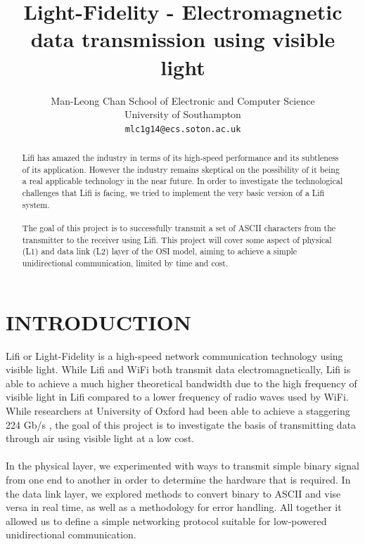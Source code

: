 \documentclass[letterpaper, 10 pt, conference]{ieeeconf}  %
\title{\LARGE \bf
Light-Fidelity - Electromagnetic data transmission using visible light
}
\author{ \parbox{3 in}{\centering Man-Leong Chan
        School of Electronic and Computer Science\\
        University of Southampton\\
        {\tt\small mlc1g14@ecs.soton.ac.uk}}
}
\begin{document}
\maketitle
\thispagestyle{empty}
\pagestyle{empty}


\begin{abstract}

Lifi has amazed the industry in terms of its high-speed performance and its subtleness of its application. However the industry remains skeptical on the possibility of it being a real applicable technology in the near future. In order to investigate the technological challenges that Lifi is facing, we tried to implement the very basic version of a Lifi system.\\ \\
The goal of this project is to successfully transmit a set of ASCII characters from the transmitter to the receiver using Lifi. This project will cover some aspect of physical (L1) and data link (L2) layer of the OSI model, aiming to achieve a simple unidirectional communication, limited by time and cost. 

\end{abstract}
\section{INTRODUCTION}

Lifi or Light-Fidelity is a high-speed network communication technology using visible light. While Lifi and WiFi both transmit data electromagnetically, Lifi is able to achieve a much higher theoretical bandwidth due to the high frequency of visible light in Lifi compared to a lower frequency of radio waves used by WiFi.
While researchers at University of Oxford had been able to achieve a staggering 224 Gb/s \cite{Gomez2015a}, the goal of this project is to investigate the basis of transmitting data through air using visible light at a low cost. 
\\ \\
In the physical layer, we experimented with ways to transmit simple binary signal from one end to another in order to determine the hardware that is required. In the data link layer, we explored methods to convert binary to ASCII and vise versa in real time, as well as a methodology for error handling. All together it allowed us to define a simple networking protocol suitable for low-powered unidirectional communication. 
\end{document}
